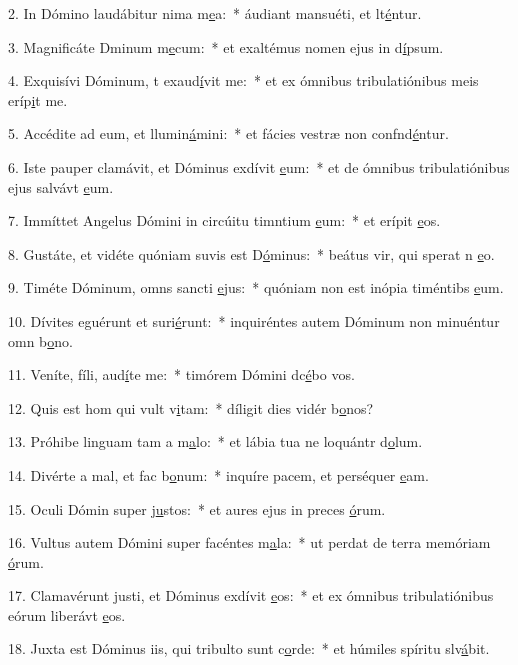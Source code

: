 2. In Dómino laudábitur nima m\uline{e}a:~* áudiant mansuéti, et lt\uline{é}ntur.\par 
3. Magnificáte Dminum m\uline{e}cum:~* et exaltémus nomen ejus in d\uline{í}psum.\par 
4. Exquisívi Dóminum, t exaud\uline{í}vit me:~* et ex ómnibus tribulatiónibus meis eríp\uline{i}t me.\par 
5. Accédite ad eum, et llumin\uline{á}mini:~* et fácies vestræ non confnd\uline{é}ntur.\par 
6. Iste pauper clamávit, et Dóminus exdívit \uline{e}um:~* et de ómnibus tribulatiónibus ejus salvávt \uline{e}um.\par 
7. Immíttet Angelus Dómini in circúitu timntium \uline{e}um:~* et erípit \uline{e}os.\par 
8. Gustáte, et vidéte quóniam suvis est D\uline{ó}minus:~* beátus vir, qui sperat n \uline{e}o.\par 
9. Timéte Dóminum, omns sancti \uline{e}jus:~* quóniam non est inópia timéntibs \uline{e}um.\par 
10. Dívites eguérunt et suri\uline{é}runt:~* inquiréntes autem Dóminum non minuéntur omn b\uline{o}no.\par 
11. Veníte, fíli, aud\uline{í}te me:~* timórem Dómini dc\uline{é}bo vos.\par 
12. Quis est hom qui vult v\uline{i}tam:~* díligit dies vidér b\uline{o}nos?\par 
13. Próhibe linguam tam a m\uline{a}lo:~* et lábia tua ne loquántr d\uline{o}lum.\par 
14. Divérte a mal, et fac b\uline{o}num:~* inquíre pacem, et perséquer \uline{e}am.\par 
15. Oculi Dómin super j\uline{u}stos:~* et aures ejus in preces \uline{ó}rum.\par 
16. Vultus autem Dómini super facéntes m\uline{a}la:~* ut perdat de terra memóriam \uline{ó}rum.\par 
17. Clamavérunt justi, et Dóminus exdívit \uline{e}os:~* et ex ómnibus tribulatiónibus eórum liberávt \uline{e}os.\par 
18. Juxta est Dóminus iis, qui tribulto sunt c\uline{o}rde:~* et húmiles spíritu slv\uline{á}bit.\par 
